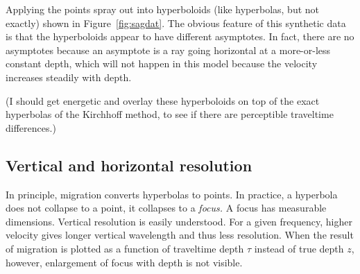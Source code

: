 
Applying %
the points spray out into hyperboloids (like hyperbolas, but not exactly)
shown in Figure~\ref{fig:sagdat}.
The obvious feature of this synthetic data is that the hyperboloids
appear to have different asymptotes.
In fact, there are no asymptotes because an asymptote
is a ray going horizontal at a more-or-less constant depth,
which will not happen in this model
because the velocity increases steadily with depth.
\par
(I should get energetic and overlay these hyperboloids
on top of the exact hyperbolas of the Kirchhoff method,
to see if there are perceptible traveltime differences.)

\subsection{Vertical and horizontal resolution}
In principle, migration converts hyperbolas to points.
In practice, a hyperbola does not collapse to a point,
it collapses to a 
{\em  focus.}
A focus has measurable dimensions.
Vertical resolution is easily understood.
For a given frequency, higher velocity gives longer vertical wavelength
and thus less resolution.
When the result of migration is plotted as a function of
traveltime depth $\tau$ instead of true depth $z$, however,
enlargement of focus with depth is not visible.


